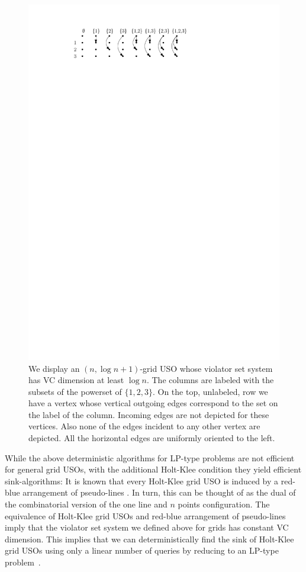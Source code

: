 \documentclass[runningheads,a4paper]{llncs}
\begin{document}
\begin{figure}[h!] 
  	\centering
  	\includegraphics{shatteredgrid.pdf}
  	\caption{\small We display an $(n,\log n + 1)$-grid USO whose violator set system has VC dimension at least $\log n$. 
	  The columns are labeled with the subsets of the powerset of $\{1,2,3\}$. On the top, unlabeled, row we have a vertex whose 
	  vertical outgoing edges correspond to the set on the label of the column. Incoming edges are not depicted for these vertices. Also none 
	  of the edges incident to any other vertex are depicted. All the horizontal edges are uniformly oriented to the left.} 
  	\label{fig:shatteredgrid}
  \end{figure}
  
While the above deterministic algorithms for LP-type problems are not efficient for general grid USOs, with the additional Holt-Klee condition they yield efficient sink-algorithms:
It is known that every Holt-Klee grid USO is induced by a red-blue arrangement of pseudo-lines \cite{grid05,falkthesis}. 
In turn, this can be thought of as the dual of the combinatorial version of the one line and $n$ points configuration.
The equivalence of Holt-Klee grid USOs and red-blue arrangement of pseudo-lines imply that the violator set system we defined above for grids has constant VC dimension. 
This implies that we can deterministically find the sink of Holt-Klee grid USOs using only a linear number of queries by reducing to an LP-type problem~\cite{chan16,ChazelleM96}.
\end{document}
